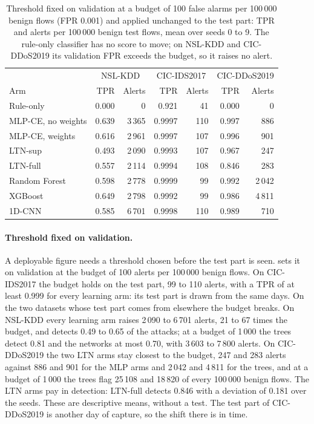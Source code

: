 \begin{table}[t]
\centering
\footnotesize
\caption{Threshold fixed on validation at a budget of 100 false alarms per 100\,000 benign flows (FPR 0.001) and
applied unchanged to the test part: TPR and alerts per 100\,000 benign test flows, mean over seeds 0 to 9. The rule-only
classifier has no score to move; on NSL-KDD and CIC-DDoS2019 its validation FPR exceeds the budget, so it raises no
alert.}
\label{tab:res-operating}
\setlength{\tabcolsep}{4pt}
\begin{tabular}{@{}lrrrrrr@{}}
\toprule
 & \multicolumn{2}{c}{NSL-KDD} & \multicolumn{2}{c}{CIC-IDS2017} & \multicolumn{2}{c}{CIC-DDoS2019} \\
Arm & TPR & Alerts & TPR & Alerts & TPR & Alerts \\
\midrule
Rule-only          & 0.000 & 0     & 0.921  & 41  & 0.000 & 0 \\
MLP-CE, no weights & 0.639 & 3\,365 & 0.9997 & 110 & 0.997 & 886 \\
MLP-CE, weights    & 0.616 & 2\,961 & 0.9997 & 107 & 0.996 & 901 \\
LTN-sup            & 0.493 & 2\,090 & 0.9993 & 107 & 0.967 & 247 \\
LTN-full           & 0.557 & 2\,114 & 0.9994 & 108 & 0.846 & 283 \\
Random Forest      & 0.598 & 2\,778 & 0.9999 & 99  & 0.992 & 2\,042 \\
XGBoost            & 0.649 & 2\,798 & 0.9992 & 99  & 0.986 & 4\,811 \\
\midrule
1D-CNN             & 0.585 & 6\,701 & 0.9998 & 110 & 0.989 & 710 \\
\bottomrule
\end{tabular}
\end{table}

\paragraph{Threshold fixed on validation.}
A deployable figure needs a threshold chosen before the test part is seen.
 sets it on validation at the budget of 100 alerts per 100\,000 benign flows. On CIC-IDS2017 the
budget holds on the test part, 99 to 110 alerts, with a TPR of at least 0.999 for every learning arm: its test part is
drawn from the same days. On the two datasets whose test part comes from elsewhere the budget breaks. On NSL-KDD every
learning arm raises 2\,090 to 6\,701 alerts, 21 to 67 times the budget, and detects 0.49 to 0.65 of the attacks; at a
budget of 1\,000 the trees detect 0.81 and the networks at most 0.70, with 3\,603 to 7\,800 alerts. On CIC-DDoS2019 the
two LTN arms stay closest to the budget, 247 and 283 alerts against 886 and 901 for the MLP arms and 2\,042 and 4\,811 for
the trees, and at a budget of 1\,000 the trees flag 25\,108 and 18\,820 of every 100\,000 benign flows. The LTN arms pay
in detection: LTN-full detects 0.846 with a deviation of 0.181 over the seeds. These are descriptive means, without a
test. The test part of CIC-DDoS2019 is another day of capture, so the shift there is in time.

